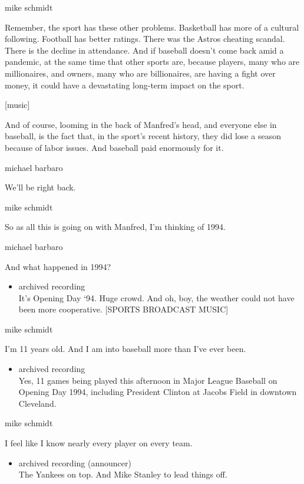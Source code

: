 mike schmidt

Remember, the sport has these other problems. Basketball has more of a
cultural following. Football has better ratings. There was the Astros
cheating scandal. There is the decline in attendance. And if baseball
doesn't come back amid a pandemic, at the same time that other sports
are, because players, many who are millionaires, and owners, many who
are billionaires, are having a fight over money, it could have a
devastating long-term impact on the sport.

{[}music{]}

And of course, looming in the back of Manfred's head, and everyone else
in baseball, is the fact that, in the sport's recent history, they did
lose a season because of labor issues. And baseball paid enormously for
it.

michael barbaro

We'll be right back.

mike schmidt

So as all this is going on with Manfred, I'm thinking of 1994.

michael barbaro

And what happened in 1994?

\begin{itemize}
\tightlist
\item
  archived recording\\
  It's Opening Day `94. Huge crowd. And oh, boy, the weather could not
  have been more cooperative. {[}SPORTS BROADCAST MUSIC{]}
\end{itemize}

mike schmidt

I'm 11 years old. And I am into baseball more than I've ever been.

\begin{itemize}
\tightlist
\item
  archived recording\\
  Yes, 11 games being played this afternoon in Major League Baseball on
  Opening Day 1994, including President Clinton at Jacobs Field in
  downtown Cleveland.
\end{itemize}

mike schmidt

I feel like I know nearly every player on every team.

\begin{itemize}
\tightlist
\item
  archived recording (announcer)\\
  The Yankees on top. And Mike Stanley to lead things off.
\end{itemize}


